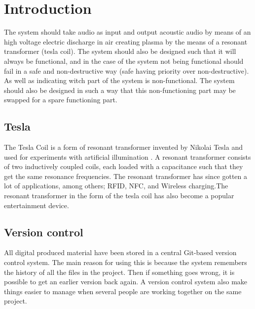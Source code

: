 \section{Introduction}
\label{intro}
The system should take audio as input and output acoustic audio by means of an high voltage electric discharge in air creating plasma by the means of a resonant transformer (tesla coil). The system should also be designed such that it will always be functional, and in the case of the system not being functional should fail in a safe and non-destructive way (safe having priority over non-destructive). As well as indicating witch part of the system is non-functional. The system should also be designed in such a way that this non-functioning part may be swapped for a spare functioning part.

\subsection{Tesla}
\label{tesla}
The Tesla Coil is a form of resonant transformer invented by Nikolai Tesla and used for experiments with artificial illumination \citep{5570149}. A resonant transformer consists of two inductively coupled coils, each loaded with a capacitance such that they get the same resonance frequencies. The resonant transformer has since gotten a lot of applications, among others; RFID, NFC, and Wireless charging.The resonant transformer in the form of the tesla coil has also become a popular entertainment device.

\subsection{Version control}
All digital produced material have been stored in a central Git-based version control system. The main reason for using this is because the system remembers the history of all the files in the project. Then if something goes wrong, it is possible to get an earlier version back again. A version control system also make things easier to manage when several people are working together on the same project.
